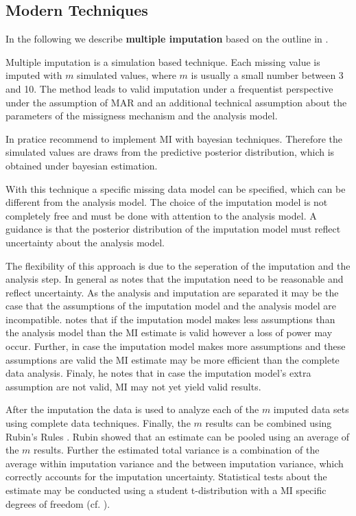 \subsection{Modern Techniques} 
 In the following we describe \textbf{multiple imputation} based on the outline in \cite{Schafer99}. \par  
Multiple imputation is a simulation based technique. Each missing value is imputed with $m$  simulated  values, where $m$ is usually a small number between 3 and 10. The method leads to valid imputation under a frequentist perspective under the assumption of MAR and an additional technical assumption about the parameters of the missigness mechanism and the analysis model. \par 
In pratice \cite{Little} recommend to implement MI with bayesian techniques. Therefore the simulated values are draws from the predictive posterior distribution, which is obtained under bayesian estimation.  \par
With this technique a specific missing data model can be specified, which can be different from the analysis model. The choice of the imputation model is not completely free and must be done with attention to the analysis model. A guidance is that the posterior distribution of the imputation model must reflect uncertainty about the analysis model. \par The flexibility of this approach is due to the seperation of the imputation and the analysis step. In general as \cite{Schafer99} notes that the imputation need to be reasonable and reflect uncertainty. As the analysis and imputation are separated it may be the case that the assumptions of the imputation model and the analysis model are incompatible. \cite{Schafer99} notes that if the imputation model makes less assumptions than the  analysis model than the MI estimate is valid however a loss of power may occur. Further, in case the imputation model makes more assumptions and these assumptions are valid the MI estimate may be more efficient than the complete data analysis. Finaly, he notes that in case the imputation model's extra assumption are not valid, MI may not yet yield valid results.  \par 
After the imputation the data is used to analyze each of the $m$ imputed data sets using complete data techniques. Finally, the $m$ results can be combined using Rubin's Rules \cite{rubin1987multiple}.  Rubin showed that an estimate can be pooled using an average of the $m$ results. Further the estimated total variance is a combination of the average within imputation variance and the between imputation variance, which correctly accounts for the imputation uncertainty. Statistical tests about the estimate may be conducted using a student t-distribution with a MI specific degrees of freedom (cf. \cite{Schafer99}).   \par 
